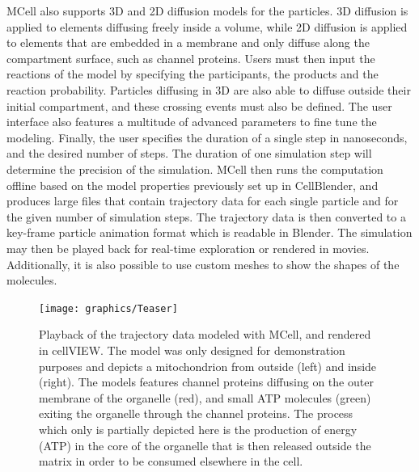 MCell also supports 3D and 2D diffusion models for the particles.
3D diffusion is applied to elements diffusing freely inside a volume, while 2D diffusion is applied to elements that are embedded in a membrane and only diffuse along the compartment surface, such as channel proteins.
Users must then input the reactions of the model by specifying the participants, the products and the reaction probability.
Particles diffusing in 3D are also able to diffuse outside their initial compartment, and these crossing events must also be defined.
The user interface also features a multitude of advanced parameters to fine tune the modeling.
Finally, the user specifies the duration of a single step in nanoseconds, and the desired number of steps. 
The duration of one simulation step will determine the precision of the simulation.
MCell then runs the computation offline based on the model properties previously set up in CellBlender, and produces large files that contain trajectory data for each single particle and for the given number of simulation steps.
The trajectory data is then converted to a key-frame particle animation format which is readable in Blender.
The simulation may then be played back for real-time exploration or rendered in movies.
Additionally, it is also possible to use custom meshes to show the shapes of the molecules.

\begin{figure}
\centering
\texttt{[image: graphics/Teaser]}
\caption{Playback of the trajectory data modeled with MCell, and rendered in cellVIEW. The model was only designed for demonstration purposes and depicts a mitochondrion from outside (left) and inside (right). The models features channel proteins diffusing on the outer membrane of the organelle (red), and small ATP molecules (green) exiting the organelle through the channel proteins. The process which only is partially depicted here is the production of energy (ATP) in the core of the organelle that is then released outside the matrix in order to be consumed elsewhere in the cell.}
\label{fig:teaser}
\end{figure}



